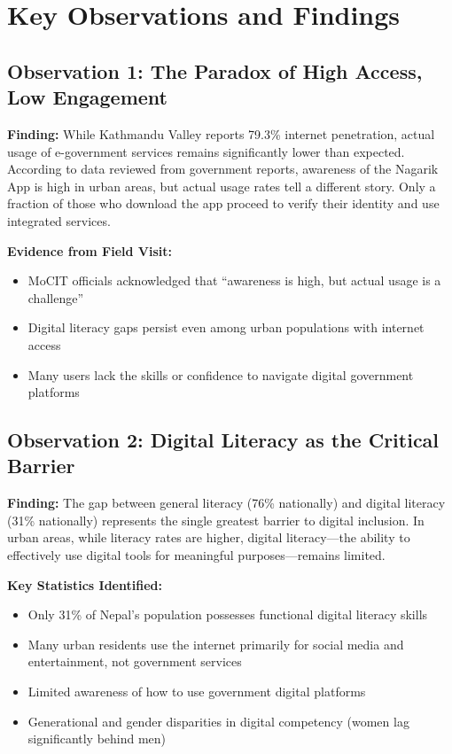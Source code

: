 \documentclass[12pt,a4paper]{article}
\begin{document}
\newpage
\section{Key Observations and Findings}
\label{sec:findings}

\subsection{Observation 1: The Paradox of High Access, Low Engagement}

\textbf{Finding:} While Kathmandu Valley reports 79.3\% internet penetration, actual usage of e-government services remains significantly lower than expected. According to data reviewed from government reports, awareness of the Nagarik App is high in urban areas, but actual usage rates tell a different story. Only a fraction of those who download the app proceed to verify their identity and use integrated services.

\textbf{Evidence from Field Visit:}
\begin{itemize}
    \item MoCIT officials acknowledged that ``awareness is high, but actual usage is a challenge''
    \item Digital literacy gaps persist even among urban populations with internet access
    \item Many users lack the skills or confidence to navigate digital government platforms
\end{itemize}

\subsection{Observation 2: Digital Literacy as the Critical Barrier}

\textbf{Finding:} The gap between general literacy (76\% nationally) and digital literacy (31\% nationally) represents the single greatest barrier to digital inclusion. In urban areas, while literacy rates are higher, digital literacy—the ability to effectively use digital tools for meaningful purposes—remains limited.

\textbf{Key Statistics Identified:}
\begin{itemize}
    \item Only 31\% of Nepal's population possesses functional digital literacy skills
    \item Many urban residents use the internet primarily for social media and entertainment, not government services
    \item Limited awareness of how to use government digital platforms
    \item Generational and gender disparities in digital competency (women lag significantly behind men)
\end{itemize}
\end{document}

